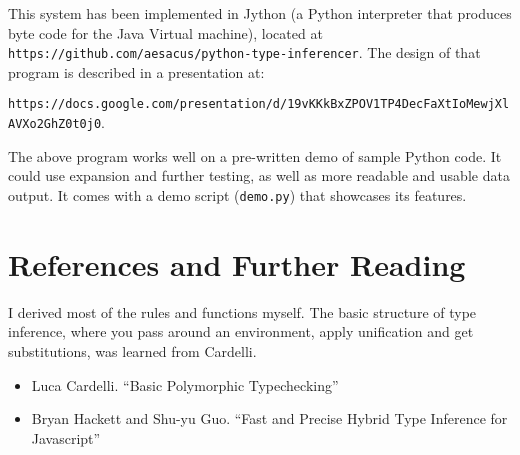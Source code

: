 \documentclass{article}
\begin{document}
This system has been implemented in Jython (a Python interpreter that produces
byte code for the Java Virtual machine), located at
\texttt{https://github.com/aesacus/python-type-inferencer}. The design of that program is described in a presentation at:

\texttt{https://docs.google.com/presentation/d/19vKKkBxZPOV1TP4DecFaXtIoMewjXlAVXo2GhZ0t0j0}.

The above program works well on a pre-written demo of sample Python code. It
could use expansion and further testing, as well as more readable and usable
data output. It comes with a demo script (\texttt{demo.py}) that showcases its
features.

\section*{References and Further Reading}

I derived most of the rules and functions myself. The basic structure of type
inference, where you pass around an environment, apply unification and get
substitutions, was learned from Cardelli.

\begin{itemize}
\item Luca Cardelli. ``Basic Polymorphic Typechecking''
\item Bryan Hackett and Shu-yu Guo. ``Fast and Precise Hybrid Type Inference for Javascript''
\end{itemize}
\end{document}
